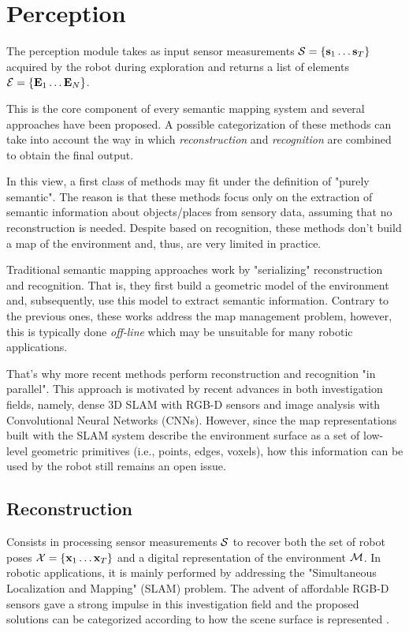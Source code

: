 \documentclass[letterpaper, 10 pt, conference]{ieeeconf}  %
\begin{document}
\section{Perception}
\label{sec:perception}


The perception module takes as input sensor measurements $\mathcal{S} = \{ \mathbf{s}_1 \dots \mathbf{s}_T \}$ acquired by the robot during exploration and returns a list of elements $\mathcal{E} = \{ \mathbf{E}_1 \dots \mathbf{E}_N \}$.

This is the core component of every semantic mapping system and several approaches have been proposed. A possible categorization of these methods can take into account the way in which \emph{reconstruction} and \emph{recognition} are combined to obtain the final output.

In this view, a first class of methods may fit under the definition of "purely semantic". The reason is that these methods focus only on the extraction of semantic information about objects/places from sensory data, assuming that no reconstruction is needed. Despite based on recognition, these methods don't build a map of the environment and, thus, are very limited in practice.

Traditional semantic mapping approaches work by "serializing" reconstruction and recognition. That is, they first build a geometric model of the environment and, subsequently, use this model to extract semantic information. Contrary to the previous ones, these works address the map management problem, however, this is typically done \emph{off-line} which may be unsuitable for many robotic applications.

That's why more recent methods perform reconstruction and recognition "in parallel". This approach is motivated by recent advances in both investigation fields, namely, dense 3D SLAM with RGB-D sensors and image analysis with Convolutional Neural Networks (CNNs). However, since the map representations built with the SLAM system describe the environment surface as a set of low-level geometric primitives (i.e., points, edges, voxels), how this information can be used by the robot still remains an open issue.

\subsection{Reconstruction}

Consists in processing sensor measurements $\mathcal{S}$ to recover both the set of robot poses $\mathcal{X} = \{ \mathbf{x}_1 \dots \mathbf{x}_T \}$ and a digital representation of the environment $\mathcal{M}$. In robotic applications, it is mainly performed by addressing the "Simultaneous Localization and Mapping" (SLAM) problem. The advent of affordable RGB-D sensors gave a strong impulse in this investigation field and the proposed solutions can be categorized according to how the scene surface is represented \cite{cadena2016ieeetransrob}.
\end{document}
